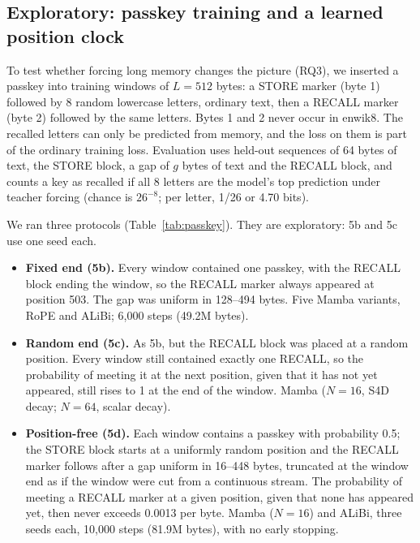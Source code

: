 \documentclass[11pt]{article}
\begin{document}
\subsection{Exploratory: passkey training and a learned position clock}\label{sec:passkey}

To test whether forcing long memory changes the picture (RQ3), we inserted a passkey into training windows of $L = 512$ bytes: a STORE marker (byte 1) followed by 8 random lowercase letters, ordinary text, then a RECALL marker (byte 2) followed by the same letters. Bytes 1 and 2 never occur in enwik8. The recalled letters can only be predicted from memory, and the loss on them is part of the ordinary training loss. Evaluation uses held-out sequences of 64 bytes of text, the STORE block, a gap of $g$ bytes of text and the RECALL block, and counts a key as recalled if all 8 letters are the model's top prediction under teacher forcing (chance is $26^{-8}$; per letter, 1/26 or 4.70 bits).

We ran three protocols (Table~\ref{tab:passkey}). They are exploratory: 5b and 5c use one seed each.

\begin{itemize}
  \item \textbf{Fixed end (5b).} Every window contained one passkey, with the RECALL block ending the window, so the RECALL marker always appeared at position 503. The gap was uniform in 128--494 bytes. Five Mamba variants, RoPE and ALiBi; 6,000 steps (49.2M bytes).
  \item \textbf{Random end (5c).} As 5b, but the RECALL block was placed at a random position. Every window still contained exactly one RECALL, so the probability of meeting it at the next position, given that it has not yet appeared, still rises to 1 at the end of the window. Mamba ($N = 16$, S4D decay; $N = 64$, scalar decay).
  \item \textbf{Position-free (5d).} Each window contains a passkey with probability 0.5; the STORE block starts at a uniformly random position and the RECALL marker follows after a gap uniform in 16--448 bytes, truncated at the window end as if the window were cut from a continuous stream. The probability of meeting a RECALL marker at a given position, given that none has appeared yet, then never exceeds 0.0013 per byte. Mamba ($N = 16$) and ALiBi, three seeds each, 10,000 steps (81.9M bytes), with no early stopping.
\end{itemize}
\end{document}
